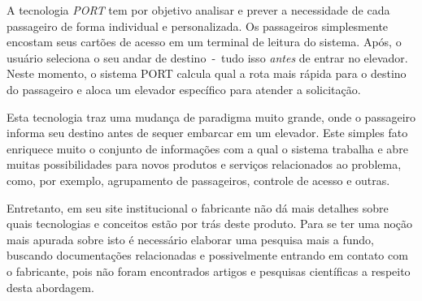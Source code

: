 A tecnologia \textit{PORT} tem por objetivo analisar e prever a necessidade de
cada passageiro de forma individual e personalizada. Os passageiros simplesmente
encostam seus cartões de acesso em um terminal de leitura do sistema. Após, o
usuário seleciona o seu andar de destino~-~tudo isso \textit{antes} de entrar no
elevador. Neste momento, o sistema PORT calcula qual a rota mais rápida para o
destino do passageiro e aloca um elevador específico para atender a solicitação.

Esta tecnologia traz uma mudança de paradigma muito grande, onde o passageiro
informa seu destino antes de sequer embarcar em um elevador. Este simples fato
enriquece muito o conjunto de informações com a qual o sistema trabalha e abre
muitas possibilidades para novos produtos e serviços relacionados ao problema,
como, por exemplo, agrupamento de passageiros, controle de acesso e outras.

Entretanto, em seu site institucional o fabricante não dá mais detalhes sobre
quais tecnologias e conceitos estão por trás deste produto. Para se ter uma
noção mais apurada sobre isto é necessário elaborar uma pesquisa mais a fundo,
buscando documentações relacionadas e possivelmente entrando em contato com o
fabricante, pois não foram encontrados artigos e pesquisas científicas a
respeito desta abordagem.
